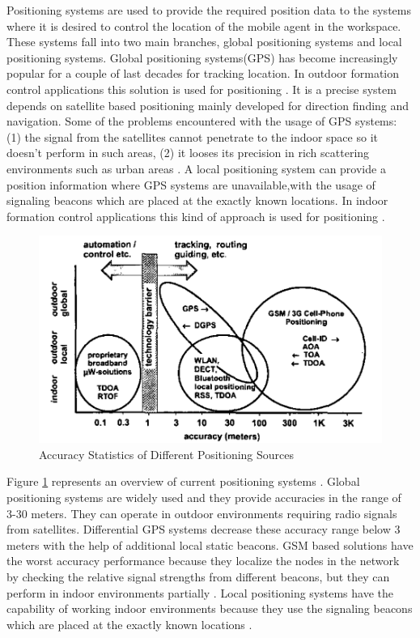 Positioning systems are used to provide the required position data to the systems where it is desired to control the location of the mobile agent in the workspace. 
These systems fall into two main branches, global positioning systems and local positioning systems. Global positioning systems(GPS) has become increasingly popular for a couple of last decades for tracking location. In outdoor formation control applications this solution is used for positioning \cite{29}. It is a precise system depends on satellite based positioning mainly developed for direction finding and navigation.  Some of the problems encountered with the usage of GPS systems: (1) the signal from the satellites cannot penetrate to the indoor space so it doesn't perform in such areas, (2) it looses its precision in rich scattering environments such as urban areas \cite{19}.  A local positioning system can provide a position information where GPS systems are unavailable,with the usage of signaling beacons which are placed at the exactly known locations. In indoor formation control applications this kind of approach is used for positioning \cite{96}. 




\begin{figure}[H]
	\caption{Accuracy Statistics of Different Positioning Sources \cite{20}} \label{overview_position}
	\centering
	\includegraphics[scale = 0.4]{gps}
\end{figure} 

Figure \ref{overview_position} represents an overview of current positioning systems \cite{20}. Global positioning systems are widely used and they provide accuracies in the range of 3-30 meters. They can operate in outdoor environments requiring radio signals from satellites. Differential GPS systems decrease these accuracy range below 3 meters with the help of additional local static beacons. GSM based solutions have the worst accuracy performance because they localize the nodes in the network by checking the relative signal strengths from different beacons, but they can perform in indoor environments partially \cite{20}.  Local positioning systems have the capability of working indoor environments because they use the signaling beacons which are placed at the exactly known locations \cite{20}. 

